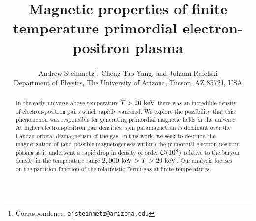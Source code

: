 \documentclass[a4paper]{article}
\title{\boldmath Magnetic properties of finite temperature primordial electron-positron plasma}
\author{Andrew Steinmetz\orc{\orcC}\thanks{Correspondence: \texttt{ajsteinmetz@arizona.edu}}, Cheng Tao Yang\orc{\orcB}, and Johann Rafelski\orc{\orcA}\\ Department of Physics, The University of Arizona, Tucson, AZ 85721, USA}
\begin{document}
\maketitle

\begin{abstract}
    In the early universe above temperature $T>20\text{ keV}$ there was an incredible density of electron-positron pairs which rapidly vanished. We explore the possibility that this phenomenon was responsible for generating primordial magnetic fields in the universe. At higher electron-positron pair densities, spin paramagnetism is dominant over the Landau orbital diamagnetism of the gas. In this work, we seek to describe the magnetization of (and possible magnetogenesis within) the primordial electron-positron plasma as it underwent a rapid drop in density of order ${\cal O}(10^{8})$ relative to the baryon density in the temperature range $2,000\text{ keV}>T>20\text{ keV}$. Our analysis focuses on the partition function of the relativistic Fermi gas at finite temperatures.
\end{abstract}


\end{document}
